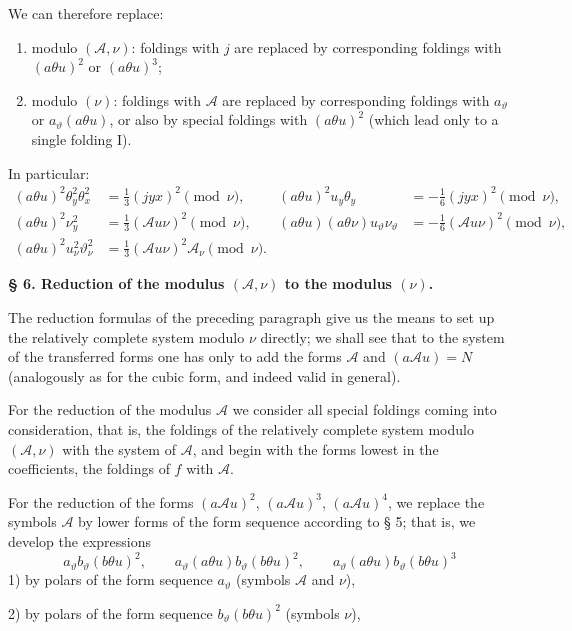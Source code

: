 \documentclass[11pt]{article}
\newcommand{\A}{\mathcal A}
\begin{document}
We can therefore replace:
\begin{enumerate}
\item modulo $(\A,\nu)$: foldings with $j$ are replaced by corresponding foldings with $(a\theta u)^2$ or $(a\theta u)^3$;
\item modulo $(\nu)$: foldings with $\A$ are replaced by corresponding foldings with $a_\vartheta$ or $a_\vartheta(a\theta u)$, or also by special foldings with $(a\theta u)^2$ (which lead only to a single folding I).
\end{enumerate}
In particular:
\[
\begin{aligned}
(a\theta u)^2\theta_y^2\theta_x^2&=\frac13(jyx)^2\pmod{\nu},&
(a\theta u)^2u_y\theta_y&=-\frac16(jyx)^2\pmod{\nu},\\
(a\theta u)^2\nu_y^2&=\frac13(\A u\nu)^2\pmod{\nu},&
(a\theta u)(a\theta\nu)u_\vartheta\nu_\vartheta&=-\frac16(\A u\nu)^2\pmod{\nu},\\
(a\theta u)^2u_\nu^2\vartheta_\nu^2&=\frac13(\A u\nu)^2\A_\nu\pmod{\nu}.
\end{aligned}
\]

\begin{center}
\textbf{§ 6. \quad Reduction of the modulus $(\A,\nu)$ to the modulus $(\nu)$.}
\end{center}

The reduction formulas of the preceding paragraph give us the means to set up the relatively complete system modulo $\nu$ directly; we shall see that to the system of the transferred forms one has only to add the forms $\A$ and $(a\A u)=N$ (analogously as for the cubic form, and indeed valid in general).

For the reduction of the modulus $\A$ we consider all special foldings coming into consideration, that is, the foldings of the relatively complete system modulo $(\A,\nu)$ with the system of $\A$, and begin with the forms lowest in the coefficients, the foldings of $f$ with $\A$.

For the reduction of the forms $(a\A u)^2$, $(a\A u)^3$, $(a\A u)^4$, we replace the symbols $\A$ by lower forms of the form sequence according to § 5; that is, we develop the expressions
\[
a_\vartheta b_\vartheta(b\theta u)^2,\qquad
a_\vartheta(a\theta u)b_\vartheta(b\theta u)^2,\qquad
a_\vartheta(a\theta u)b_\vartheta(b\theta u)^3
\]
1) by polars of the form sequence $a_\vartheta$ (symbols $\A$ and $\nu$),

2) by polars of the form sequence $b_\vartheta(b\theta u)^2$ (symbols $\nu$),
\end{document}

